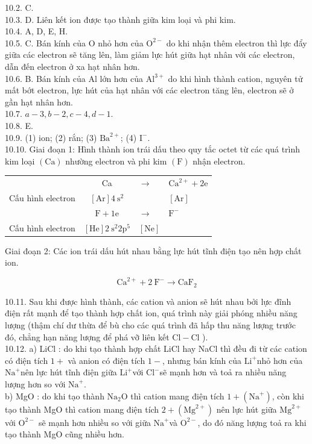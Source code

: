\documentclass[10pt]{article}
\begin{document}
10.2. C.\\
10.3. D. Liên kết ion được tạo thành giữa kim loại và phi kim.\\
10.4. A, D, E, H.\\
10.5. C. Bán kính của O nhỏ hơn của $\mathrm{O}^{2-}$ do khi nhận thêm electron thì lực đẩy giữa các electron sẽ tăng lên, làm giảm lực hút giữa hạt nhân với các electron, dẫn đến electron ở xa hạt nhân hơn.\\
10.6. B. Bán kính của Al lớn hơn của $\mathrm{Al}^{3+}$ do khi hình thành cation, nguyên tử mất bớt electron, lực hút của hạt nhân với các electron tăng lên, electron sẽ ở gần hạt nhân hơn.\\
10.7. $a-3, b-2, c-4, d-1$.\\
10.8. E.\\
10.9. (1) ion; (2) rắn; (3) $\mathrm{Ba}^{2+}$; (4) $\mathrm{I}^{-}$.\\
10.10. Giai đoạn 1: Hình thành ion trái dấu theo quy tắc octet từ các quá trình kim loại $(\mathrm{Ca})$ nhường electron và phi kim $(\mathrm{F})$ nhận electron.

\begin{center}
\begin{tabular}{lcll}
 & Ca & $\rightarrow$ & $\mathrm{Ca}^{2+}+2 \mathrm{e}$ \\
Cấu hình electron & $[\mathrm{Ar}] 4 \mathrm{~s}^{2}$ &  & $[\mathrm{Ar}]$ \\
 & $\mathrm{F}+1 \mathrm{e}$ & $\rightarrow$ & $\mathrm{F}^{-}$ \\
Cấu hình electron & $[\mathrm{He}] 2 \mathrm{~s}^{2} 2 \mathrm{p}^{5}$ & $[\mathrm{Ne}]$ &  \\
\end{tabular}
\end{center}

Giai đoạn 2: Các ion trái dấu hút nhau bằng lực hút tĩnh điện tạo nên hợp chất ion.

$$
\mathrm{Ca}^{2+}+2 \mathrm{~F}^{-} \rightarrow \mathrm{CaF}_{2}
$$

10.11. Sau khi được hình thành, các cation và anion sẽ hút nhau bởi lực đĩnh điện rất mạnh để tạo thành hợp chất ion, quá trình này giải phóng nhiều năng lượng (thậm chí dư thừa để bù cho các quá trình đã hấp thu năng lượng trước đó, chẳng hạn năng lượng để phá vỡ liên kết $\mathrm{Cl}-\mathrm{Cl}$ ).\\
10.12. a) LiCl : do khi tạo thành hợp chất LiCl hay NaCl thì đều đi từ các cation có điện tích $1+$ và anion có điện tích $1-$, nhưng bán kính của $\mathrm{Li}^{+}$nhỏ hơn của $\mathrm{Na}^{+}$nên lực hút tĩnh điện giữa $\mathrm{Li}^{+}$với $\mathrm{Cl}^{-}$sẽ mạnh hơn và toả ra nhiều năng lượng hơn so với $\mathrm{Na}^{+}$.\\
b) MgO : do khi tạo thành $\mathrm{Na}_{2} \mathrm{O}$ thì cation mang điện tích $1+\left(\mathrm{Na}^{+}\right)$, còn khi tạo thành MgO thì cation mang điện tích $2+\left(\mathrm{Mg}^{2+}\right)$ nên lực hút giữa $\mathrm{Mg}^{2+}$ với $\mathrm{O}^{2-}$ sẽ mạnh hơn nhiều so với giữa $\mathrm{Na}^{+}$và $\mathrm{O}^{2-}$, do đó năng lượng toả ra khi tạo thành MgO cũng nhiều hơn.
\end{document}
